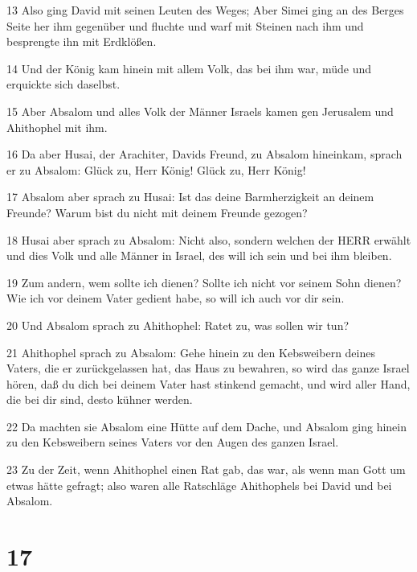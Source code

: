 \par 13 Also ging David mit seinen Leuten des Weges; Aber Simei ging an des Berges Seite her ihm gegenüber und fluchte und warf mit Steinen nach ihm und besprengte ihn mit Erdklößen.
\par 14 Und der König kam hinein mit allem Volk, das bei ihm war, müde und erquickte sich daselbst.
\par 15 Aber Absalom und alles Volk der Männer Israels kamen gen Jerusalem und Ahithophel mit ihm.
\par 16 Da aber Husai, der Arachiter, Davids Freund, zu Absalom hineinkam, sprach er zu Absalom: Glück zu, Herr König! Glück zu, Herr König!
\par 17 Absalom aber sprach zu Husai: Ist das deine Barmherzigkeit an deinem Freunde? Warum bist du nicht mit deinem Freunde gezogen?
\par 18 Husai aber sprach zu Absalom: Nicht also, sondern welchen der HERR erwählt und dies Volk und alle Männer in Israel, des will ich sein und bei ihm bleiben.
\par 19 Zum andern, wem sollte ich dienen? Sollte ich nicht vor seinem Sohn dienen? Wie ich vor deinem Vater gedient habe, so will ich auch vor dir sein.
\par 20 Und Absalom sprach zu Ahithophel: Ratet zu, was sollen wir tun?
\par 21 Ahithophel sprach zu Absalom: Gehe hinein zu den Kebsweibern deines Vaters, die er zurückgelassen hat, das Haus zu bewahren, so wird das ganze Israel hören, daß du dich bei deinem Vater hast stinkend gemacht, und wird aller Hand, die bei dir sind, desto kühner werden.
\par 22 Da machten sie Absalom eine Hütte auf dem Dache, und Absalom ging hinein zu den Kebsweibern seines Vaters vor den Augen des ganzen Israel.
\par 23 Zu der Zeit, wenn Ahithophel einen Rat gab, das war, als wenn man Gott um etwas hätte gefragt; also waren alle Ratschläge Ahithophels bei David und bei Absalom.

\chapter{17}

